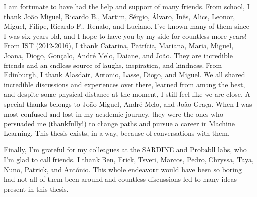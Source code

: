 \begin{acknowledgments}
    I am fortunate to have had the help and support of many friends.
    From school, I thank João Miguel, Ricardo B., Martim, Sérgio,
    Álvaro, Inês, Alice, Leonor, Miguel, Filipe, Ricardo F., Renato,
    and Luciano. I've known many of them since I was six years old,
    and I hope to have you by my side for countless more years! From
    IST (2012-2016), I thank Catarina, Patrícia, Mariana, Maria,
    Miguel, Joana, Diogo, Gonçalo, André Melo, Daiane, and João. They are
    incredible friends and an endless source of laughs, inspiration,
    and kindness. From Edinburgh, I thank Alasdair, Antonio, Lasse,
    Diogo, and Miguel. We all shared incredible discussions and
    experiences over there, learned from among the best, and despite
    some physical distance at the moment, I still feel like we are
    close. A special thanks belongs to João Miguel, André Melo, and
    João Graça. When I was most confused and lost in my academic
    journey, they were the ones who persuaded me (thankfully!) to
    change paths and pursue a career in Machine Learning. This thesis
    exists, in a way, because of conversations with them.
    
    Finally, I'm grateful for my colleagues at the SARDINE and
    Probabll labs, who I'm glad to call friends. I thank Ben, Erick,
    Tsveti, Marcos, Pedro, Chryssa, Taya, Nuno, Patrick, and António.
    This whole endeavour would have been so boring had not all of
    them been around and countless discussions led to many ideas
    present in this thesis.
    
\end{acknowledgments}
\clearpage
\thispagestyle{empty}
\cleardoublepage
\singlespacing
{}